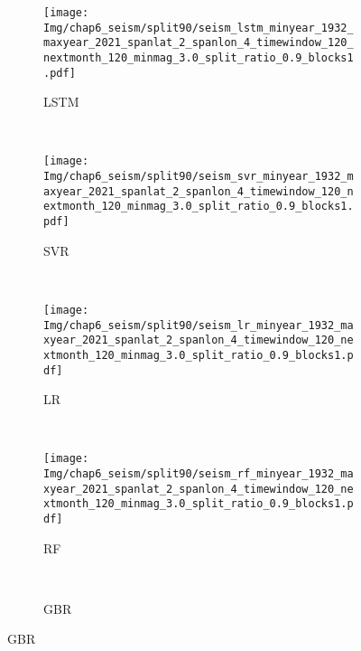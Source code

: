 \begin{figure}[!htbp]
  \vspace{-2cm}
  \centering
  \begin{subfigure}[b]{0.45\textwidth}
    \caption{LSTM}
    \texttt{[image: Img/chap6\_seism/split90/seism\_lstm\_minyear\_1932\_maxyear\_2021\_spanlat\_2\_spanlon\_4\_timewindow\_120\_nextmonth\_120\_minmag\_3.0\_split\_ratio\_0.9\_blocks1.pdf]}
    \vspace{-1cm}
    \label{fig:seism_lstm_minyear_1932_maxyear_2021_spanlat_2_spanlon_4_timewindow_120_nextmonth_120_minmag_3.0_split_ratio_0.9_blocks1}
  \end{subfigure}
  ~
  \begin{subfigure}[b]{0.45\textwidth}
    \caption{SVR} 
    \texttt{[image: Img/chap6\_seism/split90/seism\_svr\_minyear\_1932\_maxyear\_2021\_spanlat\_2\_spanlon\_4\_timewindow\_120\_nextmonth\_120\_minmag\_3.0\_split\_ratio\_0.9\_blocks1.pdf]}
    \vspace{-1cm}
    \label{fig:seism_svr_minyear_1932_maxyear_2021_spanlat_2_spanlon_4_timewindow_120_nextmonth_120_minmag_3.0_split_ratio_0.9_blocks1}
  \end{subfigure}   
  \\
  \begin{subfigure}[b]{0.45\textwidth}
      \caption{LR}
      \vspace{-0.2cm}
      \texttt{[image: Img/chap6\_seism/split90/seism\_lr\_minyear\_1932\_maxyear\_2021\_spanlat\_2\_spanlon\_4\_timewindow\_120\_nextmonth\_120\_minmag\_3.0\_split\_ratio\_0.9\_blocks1.pdf]}
      \vspace{-1cm}
      \label{fig:seism_lr_minyear_1932_maxyear_2021_spanlat_2_spanlon_4_timewindow_120_nextmonth_120_minmag_3.0_split_ratio_0.9_blocks1}
  \end{subfigure}
  ~
  \begin{subfigure}[b]{0.45\textwidth}
    \caption{RF}
    \vspace{-0.2cm}
    \texttt{[image: Img/chap6\_seism/split90/seism\_rf\_minyear\_1932\_maxyear\_2021\_spanlat\_2\_spanlon\_4\_timewindow\_120\_nextmonth\_120\_minmag\_3.0\_split\_ratio\_0.9\_blocks1.pdf]}
    \vspace{-1cm}
    \label{fig:seism_rf_minyear_1932_maxyear_2021_spanlat_2_spanlon_4_timewindow_120_nextmonth_120_minmag_3.0_split_ratio_0.9_blocks1}
  \end{subfigure}
  \\
  \begin{subfigure}[b]{0.45\textwidth}
    \caption{GBR}

\end{subfigure}
\end{figure}
